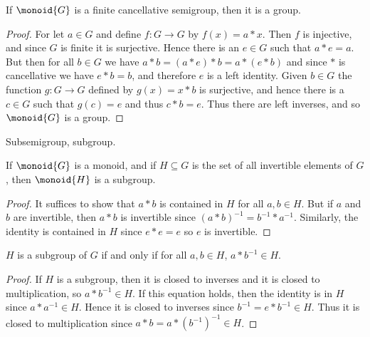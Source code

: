 \documentclass{article}                                                        %
\begin{document}
            \begin{theorem}
                If $\monoid{G}$ is a finite cancellative semigroup, then it is
                a group.
            \end{theorem}
            \begin{proof}
                For let $a\in{G}$ and define $f:G\rightarrow{G}$ by
                $f(x)=a*x$. Then $f$ is injective, and since $G$ is finite it is
                surjective. Hence there is an $e\in{G}$ such that $a*e=a$. But
                then for all $b\in{G}$ we have $a*b=(a*e)*b=a*(e*b)$ and since
                $*$ is cancellative we have $e*b=b$, and therefore $e$ is a
                left identity. Given $b\in{G}$ the function $g:G\rightarrow{G}$
                defined by $g(x)=x*b$ is surjective, and hence there is a
                $c\in{G}$ such that $g(c)=e$ and thus $c*b=e$. Thus there are
                left inverses, and so $\monoid{G}$ is a group.
            \end{proof}
            Subsemigroup, subgroup.
            \begin{theorem}
                If $\monoid{G}$ is a monoid, and if $H\subseteq{G}$ is the set
                of all invertible elements of $G$, then $\monoid{H}$ is a
                subgroup.
            \end{theorem}
            \begin{proof}
                It suffices to show that $a*b$ is contained in $H$ for all
                $a,b\in{H}$. But if $a$ and $b$ are invertible, then $a*b$ is
                invertible since
                $(a*b)^{\minus{1}}=b^{\minus{1}}*a^{\minus{1}}$. Similarly, the
                identity is contained in $H$ since $e*e=e$ so $e$ is invertible.
            \end{proof}
            \begin{theorem}
                $H$ is a subgroup of $G$ if and only if for all $a,b\in{H}$,
                $a*b^{\minus{1}}\in{H}$.
            \end{theorem}
            \begin{proof}
                If $H$ is a subgroup, then it is closed to inverses and it is
                closed to multiplication, so $a*b^{\minus{1}}\in{H}$. If this
                equation holds, then the identity is in $H$ since
                $a*a^{\minus{1}}\in{H}$. Hence it is closed to inverses since
                $b^{\minus{1}}=e*b^{\minus{1}}\in{H}$. Thus it is closed to
                multiplication since $a*b=a*(b^{\minus{1}})^{\minus{1}}\in{H}$.
            \end{proof}
\end{document}
